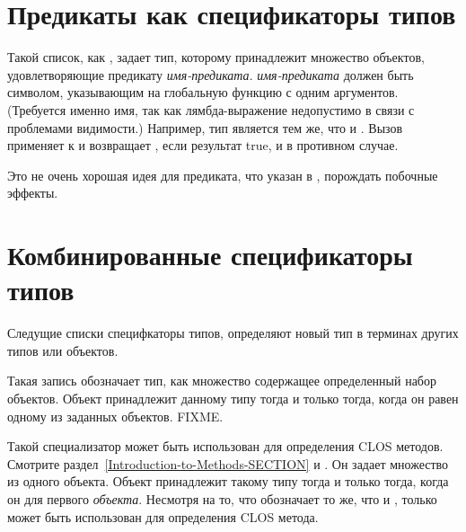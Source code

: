 \section{Предикаты как спецификаторы типов}
\label{PREDICATING-TYPE-SPECIFIERS-SECTION}

Такой список, как , задает тип, которому
принадлежит множество объектов, удовлетворяющие предикату {\it
  имя-предиката}. \emph{имя-предиката} должен быть символом, указывающим на
глобальную функцию с одним аргументов.
(Требуется именно имя, так как лямбда-выражение недопустимо в связи с проблемами
видимости.) Например, тип  является тем же, что и
.
Вызов  применяет  к  и возвращает
, если результат true, и {\nil} в противном случае.

Это не очень хорошая идея для предиката, что указан в , порождать
побочные эффекты.

\section{Комбинированные спецификаторы типов}

Следущие списки специфкаторы типов, определяют новый тип в терминах других типов
или объектов.

\begin{flushdesc}
\item[\cd{(member \emph{object1} \emph{object2} ...)}]

Такая запись обозначает тип, как множество содержащее определенный набор объектов. Объект
принадлежит данному типу тогда и только тогда, когда он равен  одному из
заданных объектов. FIXME.
\end{flushdesc}

\begin{newer}
\begin{flushdesc}
\item[\cd{(eql \emph{object})}]

Такой специализатор может быть использован для определения CLOS
методов. Смотрите раздел~\ref{Introduction-to-Methods-SECTION} и
.
Он задает множество из одного объекта. Объект принадлежит такому типу тогда и
только тогда, когда он  для первого \emph{объекта}. Несмотря на то, что
 обозначает то же, что и ,
только  может быть использован для определения CLOS метода.
\end{flushdesc}
\end{newer}

